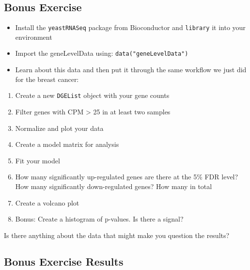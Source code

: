 \documentclass[
]{book}
\providecommand{\tightlist}{%
  \setlength{\itemsep}{0pt}\setlength{\parskip}{0pt}}
\begin{document}
\subsection{Bonus Exercise}\label{bonus-exercise-3}

\begin{itemize}
\tightlist
\item
  Install the \texttt{yeastRNASeq} package from Bioconductor and \texttt{library} it into your environment
\item
  Import the geneLevelData using: \texttt{data("geneLevelData")}
\item
  Learn about this data and then put it through the same workflow we just did for the breast cancer:
\end{itemize}

\begin{enumerate}
\def\labelenumi{\arabic{enumi}.}
\tightlist
\item
  Create a new \texttt{DGEList} object with your gene counts
\item
  Filter genes with CPM \textgreater{} 25 in at least two samples
\item
  Normalize and plot your data
\item
  Create a model matrix for analysis
\item
  Fit your model
\item
  How many significantly up-regulated genes are there at the 5\% FDR level? How many significantly down-regulated genes? How many in total
\item
  Create a volcano plot
\item
  Bonus: Create a histogram of p-values. Is there a signal?
\end{enumerate}

Is there anything about the data that might make you question the results?

\subsection{Bonus Exercise Results}\label{bonus-exercise-results-3}
\end{document}
